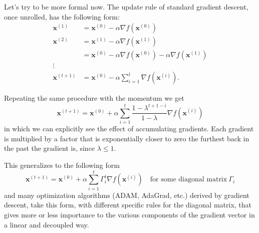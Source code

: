 Let's try to be more formal now. The update rule of standard gradient descent, once unrolled, has the following form:
\begin{equation}
    \begin{aligned}
        \mathbf{x}^{(1)} &= \mathbf{x}^{(0)} - \alpha \nabla f(\mathbf{x}^{(0)})  \\
        \mathbf{x}^{(2)} &= \mathbf{x}^{(1)} - \alpha \nabla f(\mathbf{x}^{(1)})  \\
        &= \mathbf{x}^{(0)}- \alpha \nabla f(\mathbf{x}^{(0)})  - \alpha \nabla f(\mathbf{x}^{(1)})  \\
        \vdots & \\
        \mathbf{x}^{(t+1)} & = \mathbf{x}^{(0)} - \alpha \sum_{i=1}^t \nabla f(\mathbf{x}^{(i)}).
    \end{aligned}
\end{equation}

Repeating the same procedure with the momentum we get
\begin{equation}
    \mathbf{x}^{(t+1)} = \mathbf{x}^{(0)} + \alpha \sum_{i=1}^t \frac{1-\lambda^{t+1-i}}{1-\lambda} \nabla f(\mathbf{x}^{(i)})
\end{equation}
in which we can explicitly see the effect of accumulating gradients. Each gradient is multiplied by a factor that is exponentially closer to zero the furthest back in the past the gradient is, since $\lambda \leq 1$.

This generalizes to the following form
\begin{equation}
    \mathbf{x}^{(t+1)} = \mathbf{x}^{(0)} + \alpha \sum_{i=1}^t \Gamma_i^{t} \nabla f(\mathbf{x}^{(i)}) \quad\textrm{for some diagonal matrix}~\Gamma_i
\end{equation}
and many optimization algorithms (ADAM, AdaGrad, etc.) derived by gradient descent, take this form, with different specific rules for the diagonal matrix, that gives more or less importance to the various components of the gradient vector in a linear and decoupled way.
